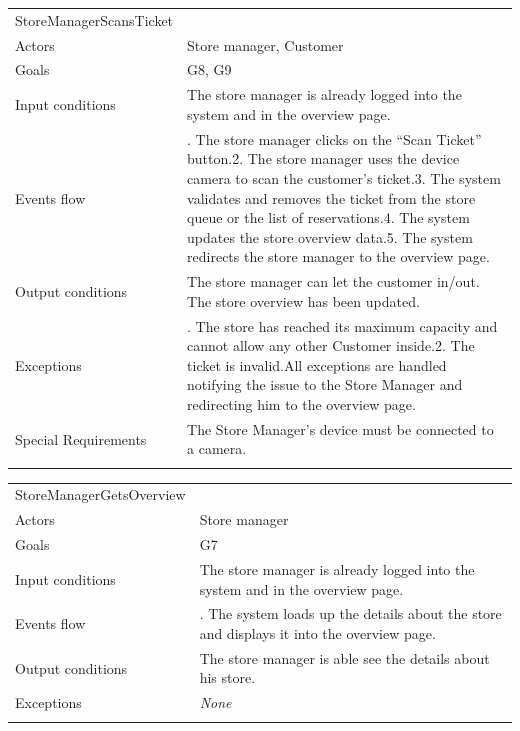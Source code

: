 \begin{longtable}[]{@{}
  >{\raggedright\arraybackslash}p{}
  >{\raggedright\arraybackslash}p{}@{}}
\toprule
StoreManagerScansTicket & \\ \addlinespace
\midrule
\endhead
Actors & Store manager, Customer \\ \addlinespace
Goals & G8, G9 \\ \addlinespace
Input conditions & The store manager is already logged into the system
and in the overview page. \\ \addlinespace
Events flow & 1. The store manager clicks on the ``Scan Ticket''
button.2. The store manager uses the device camera to scan the
customer's ticket.3. The system validates and removes the ticket from
the store queue or the list of reservations.4. The system updates the
store overview data.5. The system redirects the store manager to the
overview page. \\ \addlinespace
Output conditions & The store manager can let the customer in/out. The
store overview has been updated. \\ \addlinespace
Exceptions & 1. The store has reached its maximum capacity and cannot
allow any other Customer inside.2. The ticket is invalid.All exceptions
are handled notifying the issue to the Store Manager and redirecting him
to the overview page. \\ \addlinespace
Special Requirements & The Store Manager's device must be connected to a
camera. \\ \addlinespace
\bottomrule
\end{longtable}

\begin{longtable}[]{@{}
  >{\raggedright\arraybackslash}p{}
  >{\raggedright\arraybackslash}p{}@{}}
\toprule
StoreManagerGetsOverview & \\ \addlinespace
\midrule
\endhead
Actors & Store manager \\ \addlinespace
Goals & G7 \\ \addlinespace
Input conditions & The store manager is already logged into the system
and in the overview page. \\ \addlinespace
Events flow & 1. The system loads up the details about the store and
displays it into the overview page. \\ \addlinespace
Output conditions & The store manager is able see the details about his
store. \\ \addlinespace
Exceptions & \emph{None} \\ \addlinespace
\bottomrule
\end{longtable}

